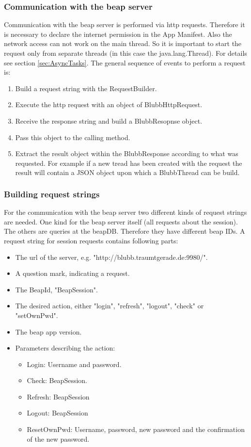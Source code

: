 \documentclass[12pt,a4paper,oneside]{report}
\newcommand{\beapDB}{beapDB}
\newcommand{\beapServer}{beap server}
\begin{document}
\subsubsection{Communication with the \beapServer{}}
Communication with the \beapServer{} is performed via http requests. Therefore it is necessary to declare the internet permission in the App Manifest. Also the network access can not work on the main thread. So it is important to start the request only from separate threads (in this case the java.lang.Thread). For details see section \ref{sec:AsyncTasks}.
The general sequence of events to perform a request is:
\begin{enumerate}
\item  Build a request string with the RequestBuilder.
\item Execute the http request with an object of BlubbHttpRequest.
\item Receive the response string and build a BlubbResopnse object.
\item Pass this object to the calling method.
\item Extract the result object within the BlubbResponse according to what was requested. For example if a new tread has been created with the request the result will contain a JSON object upon which a BlubbThread can be build.
\end{enumerate}

\subsubsection{Building request strings}
For the communication with the \beapServer{} two different kinds of request strings are needed. One kind for the \beapServer{} itself (all requests about the session). The others are queries at the \beapDB{}. Therefore they have different beap IDs.
A request string for session requests contains following parts:
\begin{itemize}
\item The url of the server, e.g. "http://blubb.traumtgerade.de:9980/".
\item A question mark, indicating a request.
\item The BeapId, "BeapSession".
\item The desired action, either "login", "refresh", "logout", "check" or "setOwnPwd".
\item The beap app version.
\item Parameters describing the action: 
	\begin{itemize}
	\item Login: Username and password.
 	\item Check: BeapSession.
 	\item Refresh: BeapSession
 	\item Logout: BeapSession
 	\item ResetOwnPwd: Username, password, new password and the confirmation of the new password.
	\end{itemize}
 		
\end{itemize}
\end{document}
